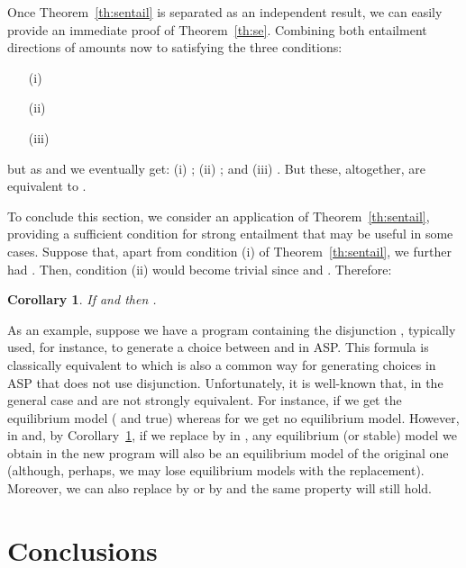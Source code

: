 \documentclass{tlp}
\def\qed{~\hfill}
\newtheorem{corollary}{Corollary}
\begin{document}
Once Theorem~\ref{th:sentail} is separated as an independent result, we can easily provide an immediate proof of Theorem~\ref{th:se}. Combining both entailment directions of  amounts now to satisfying the three conditions: 
\begin{enumerate}
\item[(i)] 
\item[(ii)]  
\item[(iii)] 
\end{enumerate}
\noindent but as  and  we eventually get: (i) ; (ii) ; and (iii) . But these, altogether, are equivalent to .

To conclude this section, we consider an application of Theorem~\ref{th:sentail}, providing a sufficient condition for strong entailment that may be useful in some cases. Suppose that, apart from condition (i) of Theorem~\ref{th:sentail}, we further had . Then, condition (ii) would become trivial since  and . Therefore:

\begin{corollary}\label{cor:ex}
If  and  then .\qed
\end{corollary}

As an example, suppose we have a program  containing the disjunction , typically used, for instance, to generate a choice between  and  in ASP. This formula is classically equivalent to  which is also a common way for generating choices in ASP that does not use disjunction. Unfortunately, it is well-known that, in the general case  and  are not strongly equivalent. For instance, if  we get the equilibrium model  ( and  true) whereas for  we get no equilibrium model. However,  in  and, by Corollary~\ref{cor:ex}, if we replace  by  in , any equilibrium (or stable) model we obtain in the new program will also be an equilibrium model of the original one (although, perhaps, we may lose equilibrium models with the replacement). Moreover, we can also replace  by  or by  and the same property will still hold.

\section{Conclusions}\label{sec:conc}
\end{document}
